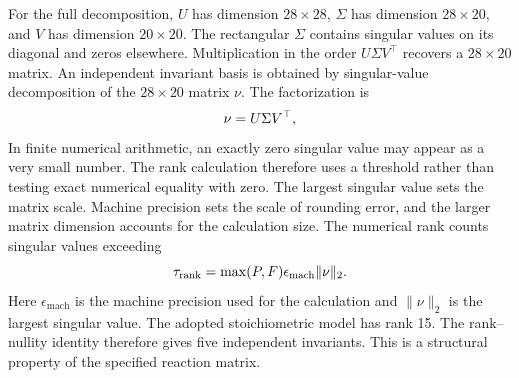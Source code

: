 For the full decomposition, $U$ has dimension $28\times28$, $\Sigma$ has dimension $28\times20$, and $V$ has dimension $20\times20$. The rectangular $\Sigma$ contains singular values on its diagonal and zeros elsewhere. Multiplication in the order $U\Sigma V^\top$ recovers a $28\times20$ matrix. An independent invariant basis is obtained by singular-value decomposition of the $28\times20$ matrix $\nu$. The factorization is
\begin{equation}
\equationname{Singular-value decomposition of the stoichiometric matrix}
\nu=U\Sigma V^\top,
\label{eq:stoichiometric_svd}
\end{equation}
In finite numerical arithmetic, an exactly zero singular value may appear as a very small number. The rank calculation therefore uses a threshold rather than testing exact numerical equality with zero. The largest singular value sets the matrix scale. Machine precision sets the scale of rounding error, and the larger matrix dimension accounts for the calculation size. The numerical rank counts singular values exceeding
\begin{equation}
\equationname{Numerical threshold for stoichiometric rank}
\tau_{\mathrm{rank}}=\max(P,F)\epsilon_{\mathrm{mach}}\|\nu\|_2.
\label{eq:stoichiometric_rank_threshold}
\end{equation}
Here $\epsilon_{\mathrm{mach}}$ is the machine precision used for the calculation and $\|\nu\|_2$ is the largest singular value. The adopted stoichiometric model has rank 15. The rank--nullity identity therefore gives five independent invariants. This is a structural property of the specified reaction matrix.


